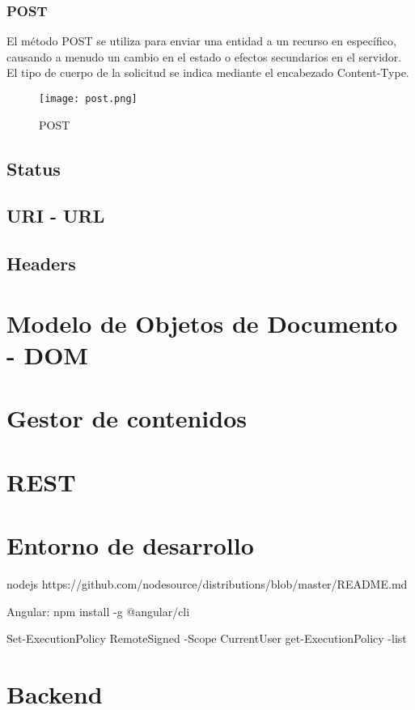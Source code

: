 \subsubsection{POST}
El método POST se utiliza para enviar una entidad a un recurso en específico, causando a menudo un cambio en el estado o efectos secundarios en el servidor. \\
El tipo de cuerpo de la solicitud se indica mediante el encabezado Content-Type.

\begin{figure}[H]
	\center
	\texttt{[image: post.png]}
	\caption{POST}
	\label{fig:super}
\end{figure}

\subsection{Status}
\subsection{URI - URL}
\subsection{Headers}

\section{Modelo de Objetos de Documento - DOM}

\section{Gestor de contenidos}

\section{REST}

\section{Entorno de desarrollo}

nodejs
https://github.com/nodesource/distributions/blob/master/README.md

Angular: npm install -g @angular/cli

Set-ExecutionPolicy RemoteSigned -Scope CurrentUser
get-ExecutionPolicy -list

\section{Backend}
